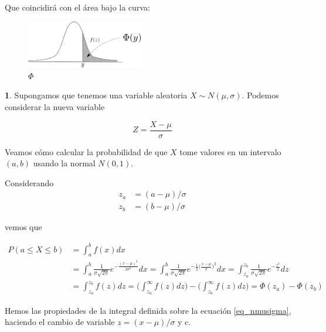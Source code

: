 \documentclass[]{book}
\theoremstyle{plain}
\theoremstyle{definition}
\theoremstyle{definition} %
\newcommand{\thistheoremname}{}
\newtheorem{genericthm}[theorem]{\thistheoremname}
\newenvironment{customdef}[1]
  {\renewcommand{\thistheoremname}{#1}%
   \begin{genericthm}}
  {\end{genericthm}}
\begin{document}
Que coincidirá con el área bajo
la curva:
 
\begin{figure}[htbp]
  \centering
  \includegraphics[width=2in,height=\textheight]{img/drawing_phi.png}
  \caption{$\Phi$}
\end{figure} 


\begin{customdef}{Uso de la Normal $N(0,1)$ para calcular probabilidades de normales $N(\mu, \sigma)$}

Supongamos que tenemos una variable aleatoria $X \sim N(\mu, \sigma)$. Podemos considerar la nueva variable

\[Z = \frac{X-\mu}{\sigma}\]

Veamos cómo calcular la probabilidad de que $X$ tome valores en un intervalo $(a, b)$ usando la normal $N(0,1)$.

Considerando  
\begin{align*}
  z_a &=(a-\mu)/\sigma\\
  z_b&=(b-\mu)/\sigma
\end{align*}

 vemos que 

\begin{align}\label{prob_phi}
    P(a\leq X\leq b)&= \int^b_a f(x) dx \\
    &= \int^b_a \frac{1}{\sigma \sqrt{2\pi}} e^{-\frac{(x-\mu)^2}{2\sigma^2}} dx
    = \int^{b}_{a} \frac{1}{\sigma \sqrt{2\pi}} e^{-\frac{1}{2}\big(\frac{x-\mu}{\sigma}\big)^2} dx
    = \int^{z_b}_{z_a} \frac{1}{\sigma \sqrt{2\pi}} e^{-\frac{z^2}{2}} dz\\ 
    &= \int^{z_b}_{z_a} f(z) dz = \bigg(\int^{\infty}_{z_a} f(z) dz\bigg) - \bigg(\int^{\infty}_{z_b} f(z) dz\bigg)  = \Phi(z_a) - \Phi(z_b)
\end{align}

Hemos las propiedades de la integral definida sobre la ecuación \ref{eq_nmusigma}, haciendo el cambio de
variable $z=(x-\mu)/\sigma$ y c.
\end{customdef}
\end{document}
